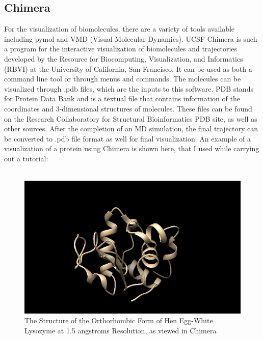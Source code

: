 \documentclass[12pt, a4paper]{report}
\begin{document}
\subsection*{Chimera} 


For the visualization of biomolecules, there are a variety of tools available including pymol and VMD (Visual Molecular Dynamics). UCSF Chimera is such a program for the interactive visualization of biomolecules and trajectories developed by the Resource for Biocomputing, Visualization, and Informatics (RBVI) at the University of California, San Francisco. It can be used as both a command line tool or through menus and commands. The molecules can be visualized through .pdb files, which are the inputs to this software. PDB stands for Protein Data Bank and is a textual file that contains information of the coordinates and 3-dimensional structures of molecules. These files can be found on the Research Collaboratory for Structural Bioinformatics PDB site, as well as other sources. After the completion of an MD simulation, the final trajectory can be converted to .pdb file format as well for final visualization. An example of a visualization of a protein using Chimera is shown here, that I used while carrying out a tutorial: 
\\~\\ 
\begin{figure}[h]
    \includegraphics[scale=0.9]{images/hen egg white lysosyme.png} 
    \centering 
    \begin{center} \caption{The Structure of the Orthorhombic Form of Hen Egg-White Lysozyme at 1.5 angstroms Resolution, as viewed in Chimera} 
    \centering 
    \end{center} 
\end{figure} 
\end{document}
